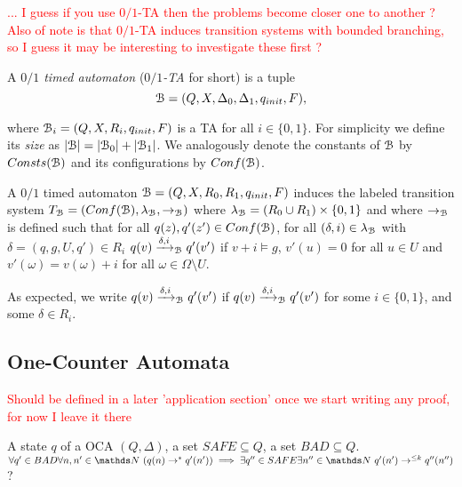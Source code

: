 \textcolor{red}{... I guess if you use $0/1$-TA then the problems become closer one to another ? Also of note is that $0/1$-TA induces transition systems with bounded branching, so I guess it may be interesting to investigate these first ?}

A {\em $0/1$ timed automaton } ({\em $0/1$-TA} for short) is a tuple
$$\mathcal{B}=(Q,X, \Delta_0, \Delta_1, q_{init}, F),$$
\par\noindent\ignorespacesafterend
 where
$\mathcal{B}_i=(Q,X, R_i, q_{init}, F)$ is a TA for all $i \in \{0,1\}$.
For simplicity we define its {\em size}
as $|\mathcal{B}|=|\mathcal{B}_0|+|\mathcal{B}_1|$.
We analogously denote the constants of $\mathcal{B}$ 
by $\Const(\B)$ and its configurations by  $\Conf(\B)$.

\begin{samepage}
A $0/1$ timed automaton $\mathcal{B}=(Q,X,R_0,R_1,q_{init},F)$ 
induces the labeled transition system 
$T_{\B} = (\Conf(\B), \lambda_{\B}, \rightarrow_{\B}) $
where $ \lambda_{\mathcal{B}} = (R_0 \cup R_1) \times \{ 0,1\}$
	and where $ \rightarrow_{\mathcal{B}}$
	is defined such that
	for all $q(z), q'(z') \in \Conf(\B)$, 
	for all $(\delta,i) \in \lambda_{\mathcal{B}}$
	with $\delta  = (q,g,U,q')\in R_i$
	$q(v)\xrightarrow{\delta,i}_{\mathcal{B}} q'(v')$ if
	$v+i \models g$, 
	$v'(u)=0$ for all $u \in U$ and $v'(\omega)=v(\omega)+ i$ for all $\omega \in \Omega
	\setminus U$. 
\end{samepage}



As expected, we write $q(v)\xrightarrow{\delta,i}_{\mathcal{B}}q'(v')$ if 
$q(v)\xrightarrow{\delta,i}_{\mathcal{B}}q'(v')$ for some 
$i\in\{0,1\}$, and some $\delta \in R_i$.




\subsection{One-Counter Automata}

\textcolor{red}{Should be defined in a later 'application section' once we start writing any proof, for now I leave it there} 


{A state $q$ of a OCA $(Q, \Delta)$, a set $SAFE \subseteq Q$, a set $BAD \subseteq Q$.}
{$\forall q' \in BAD \forall n,n' \in \N ~ (q(n) \rightarrow^* q'(n')) \implies \exists q'' \in SAFE \exists n'' \in \N ~ q'(n') \rightarrow^{\leq k} q''(n'')$ ?\newline}



